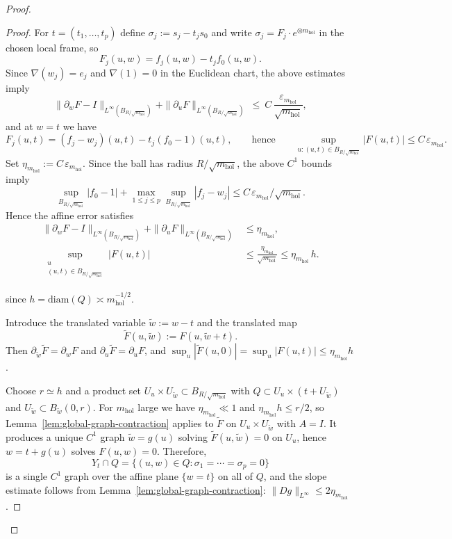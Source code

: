 \documentclass[11pt]{article}
\numberwithin{equation}{section}  %
\theoremstyle{plain}
\theoremstyle{definition}
\theoremstyle{remark}
\newcommand{\mhol}{m_{\mathrm{hol}}} %
\begin{document}
\begin{proof}
\begin{proof}
For $t=(t_1,\dots,t_p)$ define $\sigma_j:=s_j-t_j s_0$ and write
$\sigma_j=F_j\cdot e^{\otimes \mhol}$ in the chosen local frame, so
\[
F_j(u,w)=f_j(u,w)-t_j f_0(u,w).
\]
Since $\nabla(w_j)=e_j$ and $\nabla(1)=0$ in the Euclidean chart, the above estimates imply
\[
\|\partial_w F-I\|_{L^\infty(B_{R/\sqrt{\mhol}})}+\|\partial_u F\|_{L^\infty(B_{R/\sqrt{\mhol}})}
\ \le\ C\,\frac{\varepsilon_{\mhol}}{\sqrt{\mhol}},
\]
and at $w=t$ we have
\[
F_j(u,t)=(f_j-w_j)(u,t)-t_j(f_0-1)(u,t),
\qquad\text{hence}\qquad
\sup_{u:(u,t)\in B_{R/\sqrt{\mhol}}}|F(u,t)|\le C\,\varepsilon_{\mhol} .
\]
{Set $\eta_{\mhol}:=C\,\varepsilon_{\mhol}$. Since the ball has radius $R/\sqrt{\mhol}$, the above $C^1$ bounds imply}
\[
\sup_{B_{R/\sqrt{\mhol}}}|f_0-1|+\max_{1\le j\le p}\sup_{B_{R/\sqrt{\mhol}}}|f_j-w_j|
\le C\,\varepsilon_{\mhol}/\sqrt{\mhol}.
\]
Hence the affine error satisfies
\[
\begin{aligned}
	\|\partial_w F-I\|_{L^\infty(B_{R/\sqrt{\mhol}})}
	+\|\partial_u F\|_{L^\infty(B_{R/\sqrt{\mhol}})}
	&\le \eta_{\mhol},\\
	\sup_{\substack{u\\(u,t)\in B_{R/\sqrt{\mhol}}}} |F(u,t)|
	&\le \frac{\eta_{\mhol}}{\sqrt{\mhol}}
	\le \eta_{\mhol}\,h.
\end{aligned}
\]

since $h=\mathrm{diam}(Q)\asymp \mhol^{-1/2}$.

Introduce the translated variable $\widetilde w:=w-t$ and the translated map
\[
\widetilde F(u,\widetilde w):=F(u,\widetilde w+t).
\]
Then $\partial_{\widetilde w}\widetilde F=\partial_w F$ and $\partial_u\widetilde F=\partial_u F$, and
$\sup_{u}|\widetilde F(u,0)|=\sup_{u}|F(u,t)|\le \eta_{\mhol} h$.

Choose $r\simeq h$ and a product set $U_u\times U_{\widetilde w}\subset B_{R/\sqrt{\mhol}}$
with $Q\subset U_u\times (t+U_{\widetilde w})$ and $U_{\widetilde w}\subset B_{\widetilde w}(0,r)$.
For $\mhol$ large we have $\eta_{\mhol}\ll 1$ and $\eta_{\mhol} h\le r/2$, so Lemma~\ref{lem:global-graph-contraction}
applies to $\widetilde F$ on $U_u\times U_{\widetilde w}$ with $A=I$.
It produces a unique $C^1$ graph $\widetilde w=g(u)$ solving $\widetilde F(u,\widetilde w)=0$ on $U_u$,
hence $w=t+g(u)$ solves $F(u,w)=0$.
Therefore,
\[
Y_t\cap Q=\{(u,w)\in Q:\sigma_1=\cdots=\sigma_p=0\}
\]
is a single $C^1$ graph over the affine plane $\{w=t\}$ on all of $Q$,
and the slope estimate follows from Lemma~\ref{lem:global-graph-contraction}:
$\|Dg\|_{L^\infty}\le 2\eta_{\mhol}$.


\end{proof}
\end{proof}
\end{document}
